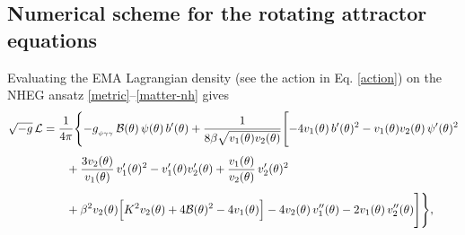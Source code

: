 \documentclass[11pt]{article}
\numberwithin{equation}{section} %
\begin{document}
\subsection{Numerical scheme for the rotating attractor equations}
\label{sec:numerics-attractor}


  {Evaluating the EMA Lagrangian density (see the action in Eq. \eqref{action}) on the NHEG ansatz \eqref{metric}--\eqref{matter-nh} gives} 
%
\begin{align}
\sqrt{-g}\,\mathcal{L}
&= \frac{1}{4\pi}\Biggl\{
-g_{_{\psi\gamma\gamma}}\,\mathcal{B}(\theta)\,\psi(\theta)\,b'(\theta)
+\frac{1}{8\beta\sqrt{v_1(\theta)v_2(\theta)}}\Biggl[
-4v_1(\theta)\,b'(\theta)^2
-v_1(\theta)v_2(\theta)\,\psi'(\theta)^2
\notag\\[0.4em]
&\qquad
+\frac{3v_2(\theta)}{v_1(\theta)}\,v_1'(\theta)^2
-v_1'(\theta)v_2'(\theta)
+\frac{v_1(\theta)}{v_2(\theta)}\,v_2'(\theta)^2
\label{eq:LNH}\\[0.4em]
&\qquad
+\beta^2v_2(\theta)\Bigl[K^2v_2(\theta)+4\mathcal{B}(\theta)^2-4v_1(\theta)\Bigr]
-4v_2(\theta)\,v_1''(\theta)
-2v_1(\theta)\,v_2''(\theta)
\Biggr]\Biggr\},
\notag
\end{align}
\end{document}
